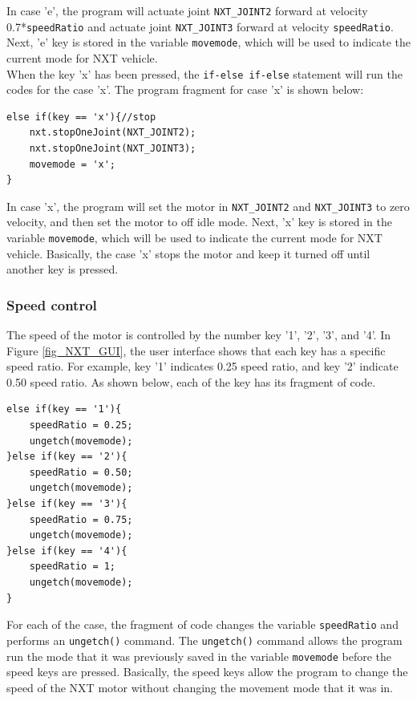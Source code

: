 \documentclass[11pt]{article}
\begin{document}
In case 'e', the program will actuate joint \verb+NXT_JOINT2+ forward at velocity 
0.7*\verb+speedRatio+ and actuate joint \verb+NXT_JOINT3+ forward at velocity 
\verb+speedRatio+. Next, 'e' key is stored in the variable \verb+movemode+, which will 
be used to indicate the current mode for NXT vehicle.\\ 
\newline
\noindent
When the key 'x' has been pressed, the \verb+if-else if-else+ statement will run the codes for the case 'x'.
The program fragment for case 'x' is shown below:
\begin{verbatim} 
else if(key == 'x'){//stop
    nxt.stopOneJoint(NXT_JOINT2);
    nxt.stopOneJoint(NXT_JOINT3);
    movemode = 'x';
}
\end{verbatim}
In case 'x', the program will set the motor in \verb+NXT_JOINT2+ and \verb+NXT_JOINT3+ to zero 
velocity, and then set the motor to off idle mode. Next, 'x' key is stored in the variable 
\verb+movemode+, which will be used to indicate the current mode for NXT vehicle.
Basically, the case 'x' stops the motor and keep it turned off until another key is pressed.

\subsubsection*{Speed control}
The speed of the motor is controlled by the number key '1', '2', '3', and '4'.
In Figure \ref{fig_NXT_GUI}, the user interface shows that each key has a specific speed ratio.
For example, key '1' indicates 0.25 speed ratio, and key '2' indicate 0.50 speed ratio.
As shown below, each of the key has its fragment of code.
\begin{verbatim}
else if(key == '1'){
    speedRatio = 0.25;
    ungetch(movemode);
}else if(key == '2'){
    speedRatio = 0.50;
    ungetch(movemode);
}else if(key == '3'){
    speedRatio = 0.75;
    ungetch(movemode);
}else if(key == '4'){
    speedRatio = 1;
    ungetch(movemode);
}
\end{verbatim}
\noindent
For each of the case, the fragment of code changes the variable \verb+speedRatio+ and performs an \verb+ungetch()+ command.
The \verb+ungetch()+ command allows the program run the mode that it was previously saved in the variable \verb+movemode+
before the speed keys are pressed. Basically, the speed keys allow the program to change the speed of the NXT motor without 
changing the movement mode that it was in.
\end{document}
